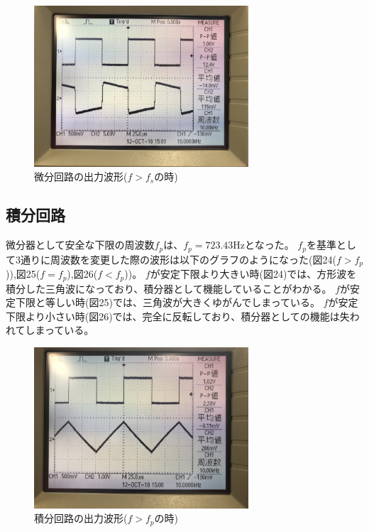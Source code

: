 \documentclass[a4paper,11pt,uplatex]{jsarticle}
\begin{document}
\begin{figure}[H]
	\begin{center}
		\includegraphics[width=8cm]{画像/f>fs.jpg}
		\caption{微分回路の出力波形($f>f_s$の時)}
	\end{center}
\end{figure}

\subsection{積分回路}
微分器として安全な下限の周波数$f_p$は、$f_p=723.43$Hzとなった。
$f_p$を基準として3通りに周波数を変更した際の波形は以下のグラフのようになった(図24($f>f_p$)),図25($f=f_p$),図26($f<f_p$))。
$f$が安定下限より大きい時(図24)では、方形波を積分した三角波になっており、積分器として機能していることがわかる。
$f$が安定下限と等しい時(図25)では、三角波が大きくゆがんでしまっている。
$f$が安定下限より小さい時(図26)では、完全に反転しており、積分器としての機能は失われてしまっている。
\begin{figure}[H]
	\begin{center}
		\includegraphics[width=8cm]{画像/f>fp.jpg}
		\caption{積分回路の出力波形($f>f_p$の時)}
	\end{center}
\end{figure}
\end{document}
